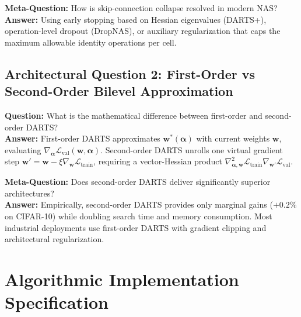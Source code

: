 \documentclass[11pt,a4paper]{article}
\theoremstyle{definition}
\begin{document}
\textbf{Meta-Question:} How is skip-connection collapse resolved in modern NAS?\\
\textbf{Answer:} Using early stopping based on Hessian eigenvalues (DARTS+), operation-level dropout (DropNAS), or auxiliary regularization that caps the maximum allowable identity operations per cell.

\subsection{Architectural Question 2: First-Order vs Second-Order Bilevel Approximation}
\textbf{Question:} What is the mathematical difference between first-order and second-order DARTS?\\
\textbf{Answer:} First-order DARTS approximates $\mathbf{w}^*(\boldsymbol{\alpha})$ with current weights $\mathbf{w}$, evaluating $\nabla_{\boldsymbol{\alpha}} \mathcal{L}_{\text{val}}(\mathbf{w}, \boldsymbol{\alpha})$. Second-order DARTS unrolls one virtual gradient step $\mathbf{w}' = \mathbf{w} - \xi \nabla_{\mathbf{w}} \mathcal{L}_{\text{train}}$, requiring a vector-Hessian product $\nabla^2_{\boldsymbol{\alpha}, \mathbf{w}} \mathcal{L}_{\text{train}} \nabla_{\mathbf{w}'} \mathcal{L}_{\text{val}}$.

\textbf{Meta-Question:} Does second-order DARTS deliver significantly superior architectures?\\
\textbf{Answer:} Empirically, second-order DARTS provides only marginal gains ($+0.2\%$ on CIFAR-10) while doubling search time and memory consumption. Most industrial deployments use first-order DARTS with gradient clipping and architectural regularization.

\section{Algorithmic Implementation Specification}
\end{document}
